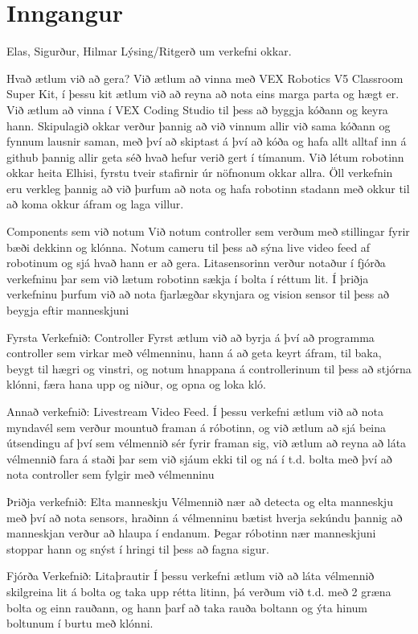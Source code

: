 \section{Inngangur}
Elas, Sigurður, Hilmar Lýsing/Ritgerð um verkefni okkar.

Hvað ætlum við að gera?
Við ætlum að vinna með VEX Robotics V5 Classroom Super Kit, í þessu kit ætlum við að reyna að nota eins marga parta og hægt er. Við ætlum að vinna í VEX Coding Studio til þess að byggja kóðann og keyra hann. Skipulagið okkar verður þannig að við vinnum allir við sama kóðann og fynnum lausnir saman, með því að skiptast á því að kóða og hafa allt alltaf inn á github þannig allir geta séð hvað hefur verið gert í tímanum. Við létum robotinn okkar heita Elhisi, fyrstu tveir stafirnir úr nöfnonum okkar allra. Öll verkefnin eru verkleg þannig að við þurfum að nota og hafa robotinn stadann með okkur til að koma okkur áfram og laga villur. 

Components sem við notum 
Við notum controller sem verðum með stillingar fyrir bæði dekkinn og klónna. Notum cameru til þess að sýna live video feed af robotinum og sjá hvað hann er að gera. Litasensorinn verður notaður í fjórða verkefninu þar sem við lætum robotinn sækja í bolta í réttum lit. Í þriðja verkefninu þurfum við að nota fjarlægðar skynjara og vision sensor til þess að beygja eftir manneskjuni 

Fyrsta Verkefnið:
Controller 
Fyrst ætlum við að byrja á því að programma controller sem virkar með vélmenninu, hann á að geta keyrt áfram, til baka, beygt til hægri og vinstri, og notum hnappana á controllerinum til þess að stjórna klónni, færa hana upp og niður, og opna og loka kló.


Annað verkefnið:
Livestream Video Feed.
Í þessu verkefni ætlum við að nota myndavél sem verður mountuð framan á róbotinn, og við ætlum að sjá beina útsendingu af því sem vélmennið sér fyrir framan sig, við ætlum að reyna að láta vélmennið fara á staði þar sem við sjáum ekki til og ná í t.d. bolta með því að nota controller sem fylgir með vélmenninu

Þriðja verkefnið:
Elta manneskju
Vélmennið nær að detecta og elta manneskju með því að nota sensors, hraðinn á vélmenninu bætist hverja sekúndu þannig að manneskjan verður að hlaupa í endanum. Þegar róbotinn nær manneskjuni stoppar hann og snýst í hringi til þess að fagna sigur.

Fjórða Verkefnið:
Litaþrautir
Í þessu verkefni ætlum við að láta vélmennið skilgreina lit á bolta og taka upp rétta litinn, þá verðum við t.d. með 2 græna bolta og einn rauðann, og hann þarf að taka rauða boltann og ýta hinum boltunum í burtu með klónni. 

